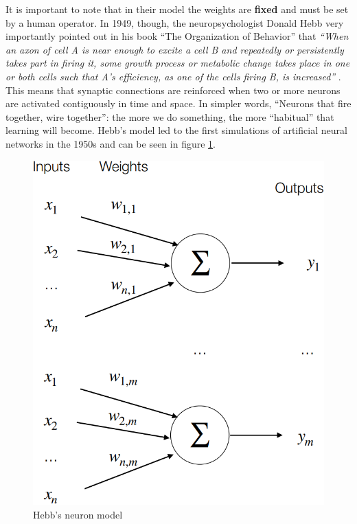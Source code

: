 It is important to note that in their model the weights are \textbf{fixed} and must be set by a human operator. In 1949, though, the neuropsychologist Donald Hebb very importantly pointed out in his book “The Organization of Behavior” that \textit{``When an axon of cell A is near enough to excite a cell B and repeatedly or persistently takes part in firing it, some growth process or metabolic change takes place in one or both cells such that A’s efficiency, as one of the cells firing B, is increased''} \cite{10.1007/978-3-642-70911-1_15}. This means that synaptic connections are reinforced when two or more neurons are activated contiguously in time and space. In simpler words, ``Neurons that fire together, wire together'': the more we do something, the more ``habitual'' that learning will become. Hebb’s model led to the first simulations of artificial neural networks in the 1950s and can be seen in figure \ref{fig:ch6-hebbneuronmodel}.

\begin{figure}
    \centering
    \includegraphics[scale=0.5]{Images/Chapter 6/hebb neuron model.png}
    \caption{Hebb's neuron model}
    \label{fig:ch6-hebbneuronmodel}
\end{figure}

